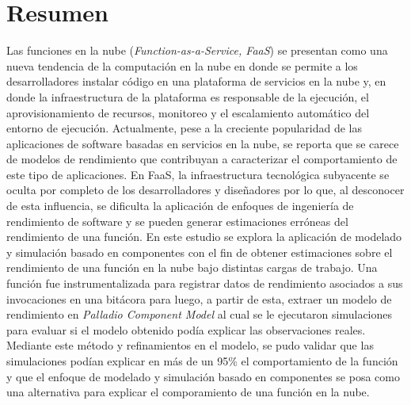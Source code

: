 \section*{Resumen}
Las funciones en la nube (\emph{Function-as-a-Service, FaaS}) se presentan como una nueva tendencia de la computación en la nube en donde se permite a los desarrolladores instalar código en una plataforma de servicios en la nube y, en donde la infraestructura de la plataforma es responsable de la ejecución, el aprovisionamiento de recursos, monitoreo y el escalamiento automático del entorno de ejecución. Actualmente, pese a la creciente popularidad de las aplicaciones de software basadas en servicios en la nube, se reporta que se carece de modelos de rendimiento que contribuyan a caracterizar el comportamiento de este tipo de aplicaciones. En FaaS, la infraestructura tecnológica subyacente se oculta por completo de los desarrolladores y diseñadores por lo que, al desconocer de esta influencia, se dificulta la aplicación de enfoques de ingeniería de rendimiento de software y se pueden generar estimaciones erróneas del rendimiento de una función. En este estudio se explora la aplicación de modelado y simulación basado en componentes con el fin de obtener estimaciones sobre el rendimiento de una función en la nube bajo distintas cargas de trabajo. Una función fue instrumentalizada para registrar datos de rendimiento asociados a sus invocaciones en una bitácora para luego, a partir de esta, extraer un modelo de rendimiento en \emph{Palladio Component Model} al cual se le ejecutaron simulaciones para evaluar si el modelo obtenido podía explicar las observaciones reales. Mediante este método y refinamientos en el modelo, se pudo validar que las simulaciones podían explicar en más de un 95\% el comportamiento de la función y que el enfoque de modelado y simulación basado en componentes se posa como una alternativa para explicar el comporamiento de una función en la nube. 

\newpage